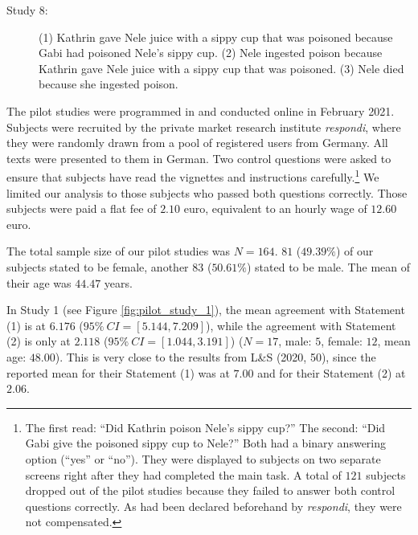 \documentclass[egregdoesnotlikesansseriftitles,12pt]{scrartcl}
\begin{document}
\begin{description}
   \item [Study 8:] (1) Kathrin gave Nele juice with a sippy cup that was poisoned because Gabi had poisoned Nele's sippy cup. (2) Nele ingested poison because Kathrin gave Nele juice with a sippy cup that was poisoned. (3) Nele died because she ingested poison.%
\end{description}

\noindent The pilot studies were programmed in \citet{limesurvey_limesurvey_2021} and conducted online in February 2021. Subjects were recruited by the private market research institute \textit{respondi}, where they were randomly drawn from a pool of registered users from Germany. All texts were presented to them in German. Two control questions were asked to ensure that subjects have read the vignettes and instructions carefully.\footnote{The first read: ``Did Kathrin poison Nele's sippy cup?'' The second: ``Did Gabi give the poisoned sippy cup to Nele?'' Both had a binary answering option (``yes'' or ``no''). They were displayed to subjects on two separate screens right after they had completed the main task.
A total of $121$ subjects dropped out of the pilot studies because they failed to answer both control questions correctly. As had been declared beforehand by \textit{respondi}, they were not compensated.} We limited our analysis to those subjects who passed both questions correctly. Those subjects were paid a flat fee of $2.10$ euro, equivalent to an hourly wage of $12.60$ euro.

The total sample size of our pilot studies was $N=164$. $81$ ($49.39\%$) of our subjects stated to be female, another $83$ ($50.61\%$) stated to be male. The mean of their age was $44.47$ years.

In Study 1 (see Figure \ref{fig:pilot_study_1}), the mean agreement with Statement (1) is at $6.176$ ($95\%~CI=[5.144,7.209]$), while the agreement with Statement (2) is only at $2.118$ ($95\%~CI=[1.044,3.191]$) ($N=17$, male: $5$, female: $12$, mean age: $48.00$). This is very close to the results from L\&S (2020, 50), since the reported mean for their Statement (1) was at $7.00$ and for their Statement (2) at $2.06$.
\end{document}
